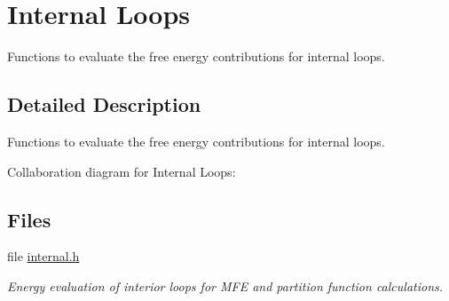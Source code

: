 \hypertarget{group__eval__loops__int}{}\section{Internal Loops}
\label{group__eval__loops__int}


Functions to evaluate the free energy contributions for internal loops.  




\subsection{Detailed Description}
Functions to evaluate the free energy contributions for internal loops. 

Collaboration diagram for Internal Loops\+:
\subsection*{Files}
\begin{DoxyCompactItemize}
\item 
file \mbox{\hyperlink{internal_8h}{internal.\+h}}
\begin{DoxyCompactList}\small\item\em Energy evaluation of interior loops for M\+FE and partition function calculations. \end{DoxyCompactList}\end{DoxyCompactItemize}
